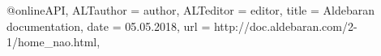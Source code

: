 @online{API,
	ALTauthor = {author},
	ALTeditor = {editor},
	title = {Aldebaran documentation},
	date = {05.05.2018},
	url = {http://doc.aldebaran.com/2-1/home_nao.html},
}
